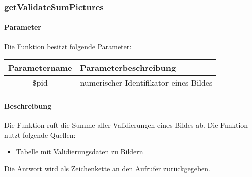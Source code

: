 \subsubsection{getValidateSumPictures}
\paragraph{Parameter} Die Funktion besitzt folgende Parameter:
\begin{table}[H]
	\begin{tabular}{|c|p{11cm}|}
		\hline
		\textbf{Parametername} & \textbf{Parameterbeschreibung} \\ \hline
		\$pid & numerischer Identifikator eines Bildes \\ \hline
	\end{tabular}
\end{table}
\paragraph{Beschreibung} Die Funktion ruft die Summe aller Validierungen eines Bildes ab. Die Funktion nutzt folgende Quellen:
\begin{itemize}
	\item Tabelle mit Validierungsdaten zu Bildern
\end{itemize}
Die Antwort wird als Zeichenkette an den Aufrufer zurückgegeben.